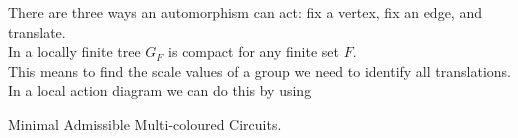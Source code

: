 \documentclass[preview]{standalone}
\begin{document}
There are three ways an automorphism can act: fix a vertex, fix an edge, and translate.\\In a locally finite tree $G_F$ is compact for any finite set $F$.\\This means to find the scale values of a group we need to identify all translations.\phantom{t} \\In a local action diagram we can do this by using \begin{center} Minimal Admissible Multi-coloured Circuits.\end{center}\\
\end{document}
